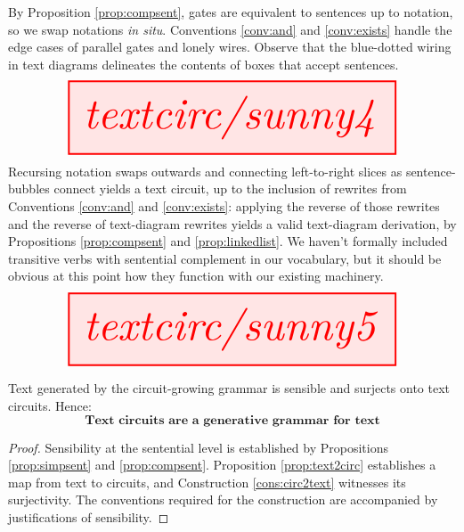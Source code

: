 \begin{myboxB}
By Proposition \ref{prop:compsent}, gates are equivalent to sentences up to notation, so we swap notations \emph{in situ}. Conventions \ref{conv:and} and \ref{conv:exists} handle the edge cases of parallel gates and lonely wires. Observe that the blue-dotted wiring in text diagrams delineates the contents of boxes that accept sentences.
\[
\resizebox{0.9\textwidth}{!}{\tikzfig{textcirc/sunny4}}
\]
Recursing notation swaps outwards and connecting left-to-right slices as sentence-bubbles connect yields a text circuit, up to the inclusion of rewrites from Conventions \ref{conv:and} and \ref{conv:exists}: applying the reverse of those rewrites and the reverse of text-diagram rewrites yields a valid text-diagram derivation, by Propositions \ref{prop:compsent} and \ref{prop:linkedlist}. We haven't formally included transitive verbs with sentential complement in our vocabulary, but it should be obvious at this point how they function with our existing machinery.
\[
\resizebox{0.9\textwidth}{!}{\tikzfig{textcirc/sunny5}}
\]
\end{myboxB}

\newpage
\clearpage

\begin{myboxB}
\begin{theorem}
Text generated by the circuit-growing grammar is sensible and surjects onto text circuits. Hence:
\[\textbf{Text circuits are a generative grammar for text}\]
\begin{proof}
Sensibility at the sentential level is established by Propositions \ref{prop:simpsent} and \ref{prop:compsent}. Proposition \ref{prop:text2circ} establishes a map from text to circuits, and Construction \ref{cons:circ2text} witnesses its surjectivity. The conventions required for the construction are accompanied by justifications of sensibility.
\end{proof}
\end{theorem}
\end{myboxB}

\clearpage
\newpage
